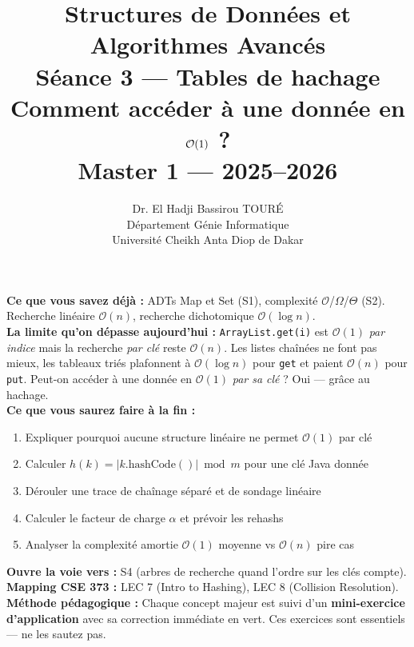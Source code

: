 \documentclass[11pt,a4paper]{article}
\title{%
\vspace{-1cm}
\textbf{\LARGE Structures de Données et}\\
\textbf{\LARGE Algorithmes Avancés}\\[0.8cm]
\textbf{\huge Séance 3 --- Tables de hachage}\\[0.3cm]
\textbf{\Large Comment accéder à une donnée en $\bigO(1)$ ?}\\[0.5cm]
\large Master 1 --- 2025--2026}
\author{Dr. El Hadji Bassirou TOURÉ\\
Département Génie Informatique\\
Université Cheikh Anta Diop de Dakar}
\date{}
\newcommand{\bigO}{\mathcal{O}}
\begin{document}
\maketitle
\thispagestyle{empty}


\begin{prereqbox}
\textbf{Ce que vous savez déjà :} ADTs Map et Set (S1), complexité $\bigO$/$\Omega$/$\Theta$ (S2). Recherche linéaire $\bigO(n)$, recherche dichotomique $\bigO(\log n)$.\\[4pt]
\textbf{La limite qu'on dépasse aujourd'hui :} \texttt{ArrayList.get(i)} est $\bigO(1)$ \emph{par indice} mais la recherche \emph{par clé} reste $\bigO(n)$. Les listes chaînées ne font pas mieux, les tableaux triés plafonnent à $\bigO(\log n)$ pour \texttt{get} et paient $\bigO(n)$ pour \texttt{put}. Peut-on accéder à une donnée en $\bigO(1)$ \emph{par sa clé} ? Oui --- grâce au hachage.\\[4pt]
\textbf{Ce que vous saurez faire à la fin :}
\begin{enumerate}[nosep]
    \item Expliquer pourquoi aucune structure linéaire ne permet $\bigO(1)$ par clé
    \item Calculer $h(k) = |k.\text{hashCode}()| \bmod m$ pour une clé Java donnée
    \item Dérouler une trace de chaînage séparé et de sondage linéaire
    \item Calculer le facteur de charge $\alpha$ et prévoir les rehashs
    \item Analyser la complexité amortie $\bigO(1)$ moyenne vs $\bigO(n)$ pire cas
\end{enumerate}
\textbf{Ouvre la voie vers :} S4 (arbres de recherche quand l'ordre sur les clés compte).\\[4pt]
\textbf{Mapping CSE 373 :} LEC 7 (Intro to Hashing), LEC 8 (Collision Resolution).\\[4pt]
\textbf{Méthode pédagogique :} Chaque concept majeur est suivi d'un \textbf{mini-exercice d'application} avec sa correction immédiate en vert. Ces exercices sont essentiels --- ne les sautez pas.
\end{prereqbox}

\tableofcontents
\newpage

\end{document}
